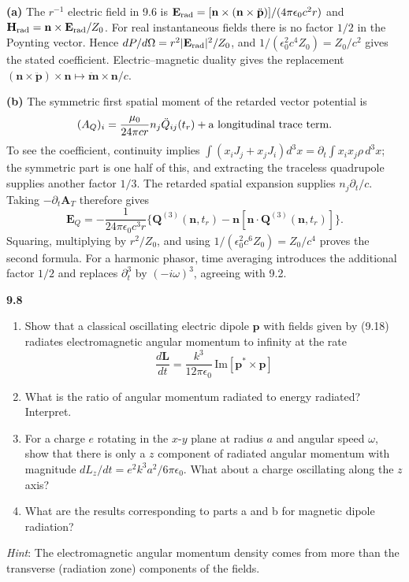 \textbf{(a)} The $r^{-1}$ electric field in 9.6 is
$\mathbf E_{\rm rad}=[\mathbf n\times(\mathbf n\times\ddot{\mathbf p})]/
(4\pi\epsilon_0c^2r)$ and
$\mathbf H_{\rm rad}=\mathbf n\times\mathbf E_{\rm rad}/Z_0$.
For real instantaneous fields there is no factor $1/2$ in the Poynting
vector. Hence $dP/d\Omega=r^2|\mathbf E_{\rm rad}|^2/Z_0$, and
$1/(\epsilon_0^2c^4Z_0)=Z_0/c^2$ gives the stated coefficient.
Electric--magnetic duality gives the replacement
$(\mathbf n\times\ddot{\mathbf p})\times\mathbf n
\mapsto\ddot{\mathbf m}\times\mathbf n/c$.

\textbf{(b)} The symmetric first spatial moment of the retarded vector
potential is
\[
( A_Q)_i=\frac{\mu_0}{24\pi cr}n_j\ddot Q_{ij}(t_r)
+\hbox{a longitudinal trace term}.
\]
To see the coefficient, continuity implies
$\int(x_iJ_j+x_jJ_i)d^3x=\partial_t\int x_ix_j\rho\,d^3x$;
the symmetric part is one half of this, and extracting the traceless
quadrupole supplies another factor $1/3$. The retarded spatial expansion
supplies $n_j\partial_t/c$. Taking $-\partial_t\mathbf A_T$ therefore gives
\[
\mathbf E_Q=-\frac{1}{24\pi\epsilon_0c^3r}
\{\mathbf Q^{(3)}(\mathbf n,t_r)
-\mathbf n[\mathbf n\cdot\mathbf Q^{(3)}(\mathbf n,t_r)]\}.
\]
Squaring, multiplying by $r^2/Z_0$, and using
$1/(\epsilon_0^2c^6Z_0)=Z_0/c^4$ proves the second formula.
For a harmonic phasor, time averaging introduces the additional factor
$1/2$ and replaces $\partial_t^3$ by $(-i\omega)^3$, agreeing with 9.2.

\par\bigskip
\noindent\textbf{9.8}\quad\begin{enumerate}
\item[(a)] Show that a classical oscillating electric dipole $\mathbf{p}$ with fields given by (9.18) radiates electromagnetic angular momentum to infinity at the rate
\[
\frac{d\mathbf{L}}{dt}=\frac{k^{3}}{12\pi\epsilon_{0}}\,\mathrm{Im}[\mathbf{p}^{*}\times\mathbf{p}]
\]
\item[(b)] What is the ratio of angular momentum radiated to energy radiated? Interpret.
\item[(c)] For a charge $e$ rotating in the $x$-$y$ plane at radius $a$ and angular speed $\omega$, show that there is only a $z$ component of radiated angular momentum with magnitude $dL_{z}/dt=e^{2}k^{3}a^{2}/6\pi\epsilon_{0}$. What about a charge oscillating along the $z$ axis?
\item[(d)] What are the results corresponding to parts a and b for magnetic dipole radiation?
\end{enumerate}
\emph{Hint}: The electromagnetic angular momentum density comes from more than the transverse (radiation zone) components of the fields.
\solution

